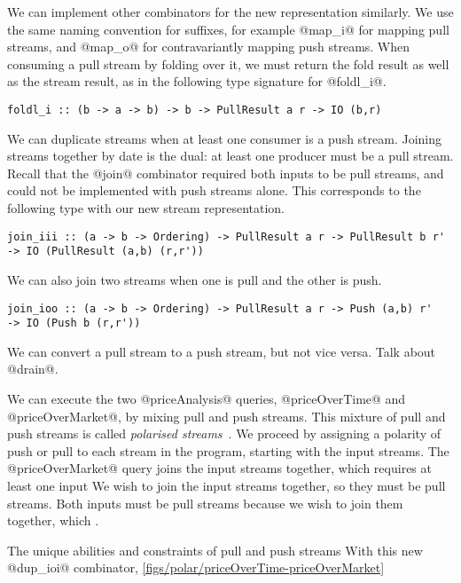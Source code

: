 We can implement other combinators for the new representation similarly.
We use the same naming convention for suffixes, for example @map_i@ for mapping pull streams, and @map_o@ for contravariantly mapping push streams.
When consuming a pull stream by folding over it, we must return the fold result as well as the stream result, as in the following type signature for @foldl_i@.
\begin{lstlisting}
foldl_i :: (b -> a -> b) -> b -> PullResult a r -> IO (b,r)
\end{lstlisting}

We can duplicate streams when at least one consumer is a push stream.
Joining streams together by date is the dual: at least one producer must be a pull stream.
Recall that the @join@ combinator required both inputs to be pull streams, and could not be implemented with push streams alone.
This corresponds to the following type with our new stream representation.

\begin{lstlisting}
join_iii :: (a -> b -> Ordering) -> PullResult a r -> PullResult b r' -> IO (PullResult (a,b) (r,r'))
\end{lstlisting}

We can also join two streams when one is pull and the other is push.

\begin{lstlisting}
join_ioo :: (a -> b -> Ordering) -> PullResult a r -> Push (a,b) r'   -> IO (Push b (r,r'))
\end{lstlisting}

We can convert a pull stream to a push stream, but not vice versa.
Talk about @drain@.

We can execute the two @priceAnalysis@ queries, @priceOverTime@ and @priceOverMarket@, by mixing pull and push streams.
This mixture of pull and push streams is called \emph{polarised streams}~\cite{lippmeier2016polarized}.
We proceed by assigning a polarity of push or pull to each stream in the program, starting with the input streams.
The @priceOverMarket@ query joins the input streams together, which requires at least one input
We wish to join the input streams together, so they must be pull streams.
Both inputs must be pull streams because we wish to join them together, which .

The unique abilities and constraints of pull and push streams
With this new @dup_ioi@ combinator, 
\autoref{figs/polar/priceOverTime-priceOverMarket}


